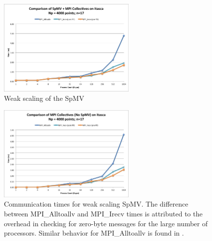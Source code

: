 \documentclass{report}
\begin{document}
\begin{figure}
\centering
\includegraphics[width=0.6\textwidth]{performance_content/scaling/weak_scaling_np4000_regular_n17_compare.png}
\caption{Weak scaling of the SpMV}
\end{figure}

\begin{figure}
\centering
\includegraphics[width=0.6\textwidth]{performance_content/scaling/weak_scaling_np4000_regular_n17_compare_commOnly.png}
\caption{Communication times for weak scaling SpMV. The difference between MPI\_Alltoallv and MPI\_Irecv times is attributed to the overhead in checking for zero-byte messages for the large number of processors. Similar behavior for MPI\_Alltoallv is found in \cite{Balaji2010}.}
\end{figure}
\end{document}
